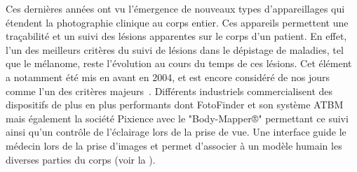 Ces dernières années ont vu l'émergence de nouveaux types d'appareillages qui étendent la photographie clinique au corps entier. Ces appareils permettent une traçabilité et un suivi des lésions apparentes sur le corps d'un patient. En effet, l'un des meilleurs critères du suivi de lésions dans le dépistage de maladies, tel que le mélanome, reste l'évolution au cours du temps de ces lésions. Cet élément a notamment été mis en avant en 2004, et est encore considéré de nos jours comme l'un des critères majeurs~\cite{Abbasi2004,Glazer2017}. Différents industriels commercialisent des dispositifs de plus en plus performants dont FotoFinder et son système ATBM mais également la société Pixience avec le "Body-Mapper®" permettant ce suivi ainsi qu'un contrôle de l'éclairage lors de la prise de vue. Une interface guide le médecin lors de la prise d'images et permet d'associer à un modèle humain les diverses parties du corps (voir la ).\par

